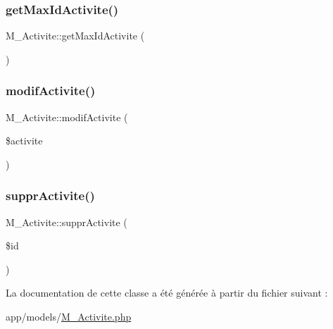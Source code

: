\mbox{\label{class_m___activite_a5b7297e0704792288f9163c93ebb961a}} 
\subsubsection{\texorpdfstring{get\+Max\+Id\+Activite()}{getMaxIdActivite()}}
{\footnotesize\ttfamily M\+\_\+\+Activite\+::get\+Max\+Id\+Activite (\begin{DoxyParamCaption}{ }\end{DoxyParamCaption})}

\mbox{\label{class_m___activite_a0499c8619fc39c3eb13f9b91ef37e885}} 
\subsubsection{\texorpdfstring{modif\+Activite()}{modifActivite()}}
{\footnotesize\ttfamily M\+\_\+\+Activite\+::modif\+Activite (\begin{DoxyParamCaption}\item[{}]{\$activite }\end{DoxyParamCaption})}

\mbox{\label{class_m___activite_a17bbfdd0eeeccacb29073d2a76228bc3}} 
\subsubsection{\texorpdfstring{suppr\+Activite()}{supprActivite()}}
{\footnotesize\ttfamily M\+\_\+\+Activite\+::suppr\+Activite (\begin{DoxyParamCaption}\item[{}]{\$id }\end{DoxyParamCaption})}



La documentation de cette classe a été générée à partir du fichier suivant \+:\begin{DoxyCompactItemize}
\item 
app/models/\hyperlink{_m___activite_8php}{M\+\_\+\+Activite.\+php}\end{DoxyCompactItemize}
